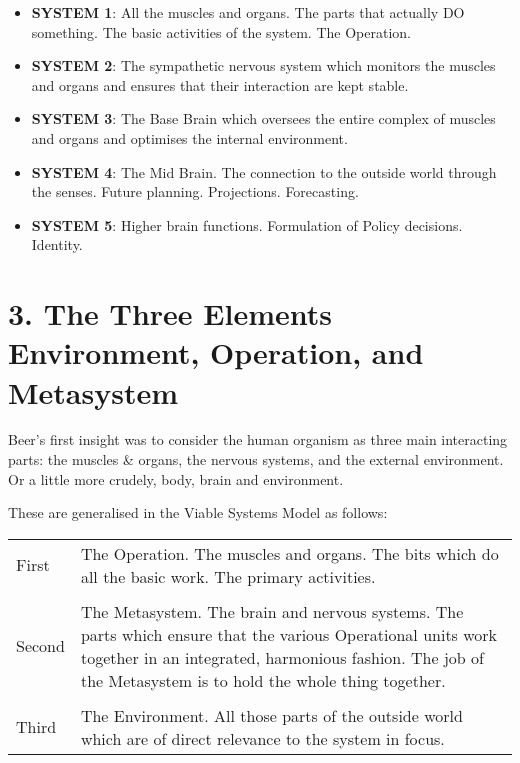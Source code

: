 \begin{itemize}
  \item \textbf{SYSTEM 1}: All the muscles and organs. The parts that actually DO something. The basic activities of the system. The Operation.

  \item \textbf{SYSTEM 2}: The sympathetic nervous system which monitors the muscles and organs and ensures that their interaction are kept stable.

  \item \textbf{SYSTEM 3}: The Base Brain which oversees the entire complex of muscles and organs and optimises the internal environment.

  \item \textbf{SYSTEM 4}: The Mid Brain. The connection to the outside world through the senses. Future planning. Projections. Forecasting.

  \item \textbf{SYSTEM 5}: Higher brain functions. Formulation of Policy decisions. Identity.

\end{itemize}

\section*{3. The Three Elements Environment, Operation, and Metasystem}
Beer's first insight was to consider the human organism as three main interacting parts: the muscles \& organs, the nervous systems, and the external environment. Or a little more crudely, body, brain and environment.

These are generalised in the Viable Systems Model as follows:

\begin{tabular}{  p{}  p{} }
First	&	The Operation. The muscles and organs. The bits which do all the basic work. The primary activities.\\
\\
Second	&	The Metasystem. The brain and nervous systems. The parts which ensure that the various Operational units work together in an integrated, harmonious fashion. The job of the Metasystem is to hold the whole thing together.\\
\\
Third	&	The Environment. All those parts of the outside world which are of direct relevance to the system in focus.
\end{tabular}

